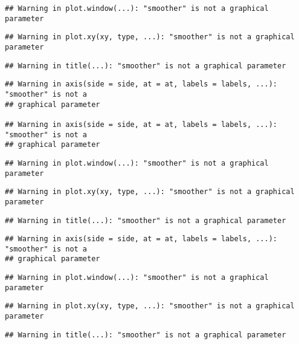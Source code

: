 \documentclass[
]{article}
\begin{document}
\begin{verbatim}
## Warning in plot.window(...): "smoother" is not a graphical parameter
\end{verbatim}

\begin{verbatim}
## Warning in plot.xy(xy, type, ...): "smoother" is not a graphical parameter
\end{verbatim}

\begin{verbatim}
## Warning in title(...): "smoother" is not a graphical parameter
\end{verbatim}

\begin{verbatim}
## Warning in axis(side = side, at = at, labels = labels, ...): "smoother" is not a
## graphical parameter

## Warning in axis(side = side, at = at, labels = labels, ...): "smoother" is not a
## graphical parameter
\end{verbatim}

\begin{verbatim}
## Warning in plot.window(...): "smoother" is not a graphical parameter
\end{verbatim}

\begin{verbatim}
## Warning in plot.xy(xy, type, ...): "smoother" is not a graphical parameter
\end{verbatim}

\begin{verbatim}
## Warning in title(...): "smoother" is not a graphical parameter
\end{verbatim}

\begin{verbatim}
## Warning in axis(side = side, at = at, labels = labels, ...): "smoother" is not a
## graphical parameter
\end{verbatim}

\begin{verbatim}
## Warning in plot.window(...): "smoother" is not a graphical parameter
\end{verbatim}

\begin{verbatim}
## Warning in plot.xy(xy, type, ...): "smoother" is not a graphical parameter
\end{verbatim}

\begin{verbatim}
## Warning in title(...): "smoother" is not a graphical parameter
\end{verbatim}
\end{document}
